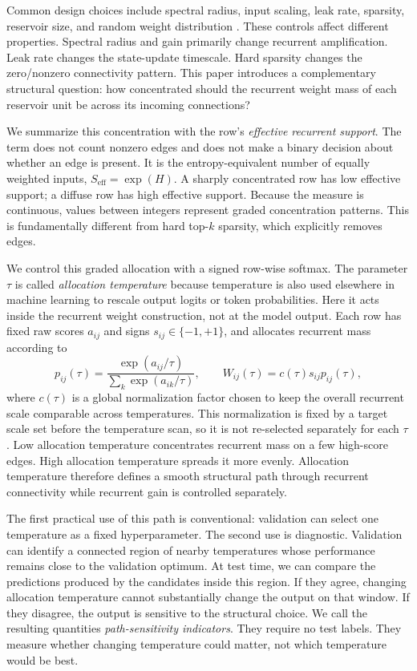 \documentclass[11pt,a4paper]{article}
\begin{document}
Common design choices include spectral radius, input scaling, leak rate, sparsity, reservoir size, and random weight distribution \citep{schrauwen2007overview,lukosevicius2009reservoir,yildiz2012revisiting}. These controls affect different properties. Spectral radius and gain primarily change recurrent amplification. Leak rate changes the state-update timescale. Hard sparsity changes the zero/nonzero connectivity pattern. This paper introduces a complementary structural question: how concentrated should the recurrent weight mass of each reservoir unit be across its incoming connections?

We summarize this concentration with the row's \emph{effective recurrent support}. The term does not count nonzero edges and does not make a binary decision about whether an edge is present. It is the entropy-equivalent number of equally weighted inputs, $S_{\mathrm{eff}}=\exp(H)$. A sharply concentrated row has low effective support; a diffuse row has high effective support. Because the measure is continuous, values between integers represent graded concentration patterns. This is fundamentally different from hard top-$k$ sparsity, which explicitly removes edges.

We control this graded allocation with a signed row-wise softmax. The parameter $\tau$ is called \emph{allocation temperature} because temperature is also used elsewhere in machine learning to rescale output logits or token probabilities. Here it acts inside the recurrent weight construction, not at the model output. Each row has fixed raw scores $a_{ij}$ and signs $s_{ij}\in\{-1,+1\}$, and allocates recurrent mass according to
\begin{equation}
  p_{ij}(\tau)=\frac{\exp(a_{ij}/\tau)}{\sum_k \exp(a_{ik}/\tau)},
  \qquad
  W_{ij}(\tau)=c(\tau) s_{ij} p_{ij}(\tau),
\end{equation}
where $c(\tau)$ is a global normalization factor chosen to keep the overall recurrent scale comparable across temperatures. This normalization is fixed by a target scale set before the temperature scan, so it is not re-selected separately for each $\tau$. Low allocation temperature concentrates recurrent mass on a few high-score edges. High allocation temperature spreads it more evenly. Allocation temperature therefore defines a smooth structural path through recurrent connectivity while recurrent gain is controlled separately.

The first practical use of this path is conventional: validation can select one temperature as a fixed hyperparameter. The second use is diagnostic. Validation can identify a connected region of nearby temperatures whose performance remains close to the validation optimum. At test time, we can compare the predictions produced by the candidates inside this region. If they agree, changing allocation temperature cannot substantially change the output on that window. If they disagree, the output is sensitive to the structural choice. We call the resulting quantities \emph{path-sensitivity indicators}. They require no test labels. They measure whether changing temperature could matter, not which temperature would be best.
\end{document}
